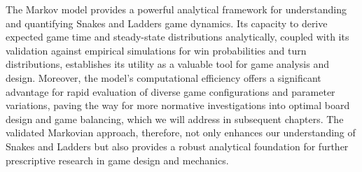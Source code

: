 The Markov model provides a powerful analytical framework for understanding and quantifying Snakes and Ladders game dynamics. Its capacity to derive expected game time and steady-state distributions analytically, coupled with its validation against empirical simulations for win probabilities and turn distributions, establishes its utility as a valuable tool for game analysis and design. Moreover, the model's computational efficiency offers a significant advantage for rapid evaluation of diverse game configurations and parameter variations, paving the way for more normative investigations into optimal board design and game balancing, which we will address in subsequent chapters. The validated Markovian approach, therefore, not only enhances our understanding of Snakes and Ladders but also provides a robust analytical foundation for further prescriptive research in game design and mechanics.